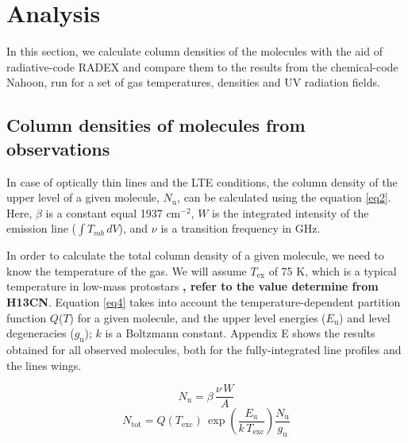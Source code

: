 \documentclass{aa}
\begin{document}
\section{Analysis}
In this section, we calculate column densities of the molecules with the aid 
of radiative-code RADEX and compare them to the results from the chemical-code Nahoon, 
run for a set of gas temperatures, densities and UV radiation fields. 
\subsection{Column densities of molecules from observations}

In case of optically thin lines and the LTE conditions, the column density of the 
upper level of a given molecule, $N_\mathrm{u}$, can be calculated using the equation \ref{eq2}. 
Here, $\beta$ is a constant equal 1937 cm$^{-2}$, $W$ is the integrated
intensity of the emission line ($\int{T_{mb} \, dV}$), and $\nu$ is a transition 
frequency in GHz. 

In order to calculate the total column density of a given molecule, 
we need to know the temperature of the gas. We will assume $T_\mathrm{ex}$ of 75 K, 
which is a typical temperature in low-mass protostars \textbf{\citep{Yil15}, refer
to the value determine from H13CN}. Equation \ref{eq4} takes into account the 
temperature-dependent partition function $Q$($T$) for a given molecule, and 
the upper level energies ($E_\mathrm{u}$) and level degeneracies ($g_\mathrm{u}$);
$k$ is a Boltzmann constant. Appendix E shows the results obtained for all observed 
molecules, both for the fully-integrated line profiles and the lines wings.


\begin{equation} 
\label{eq3} N_\mathrm{u} = \beta \, \frac{\nu \,W}{A} 
\end{equation} 
\begin{equation} 
\label{eq4} N_\mathrm{tot} = Q(T_\mathrm{exc}) \, \exp(\frac{E_\mathrm{u}}{k \, T_\mathrm{exc}})  \frac{N_\mathrm{u} }{g_\mathrm{u} } 
\end{equation} 
\end{document}
